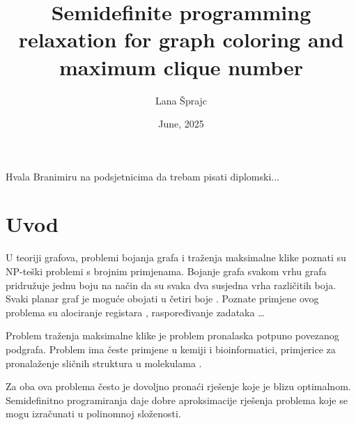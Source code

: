 \documentclass[diplomskirad]{fer}
\title{Semidefinite programming relaxation for graph coloring and maximum clique number}
\author{Lana Šprajc}
\date{June, 2025}
\begin{document}
\maketitle






\begin{zahvale}
  Hvala Branimiru na podsjetnicima da trebam pisati diplomski...
\end{zahvale}


\mainmatter


\tableofcontents


\chapter{Uvod}
\label{pog:uvod}

U teoriji grafova, problemi bojanja grafa i traženja maksimalne klike poznati su NP-teški problemi s brojnim primjenama. Bojanje grafa svakom vrhu 
grafa pridružuje jednu boju na način da su svaka dva susjedna vrha različitih boja. Svaki planar graf je moguće obojati u četiri boje \cite{fritsch1998four}.
Poznate primjene ovog problema su alociranje registara \cite{inproceedings}, raspoređivanje zadataka \cite{10.1093/comjnl/12.4.317}\dots

Problem traženja maksimalne klike je problem pronalaska potpuno povezanog podgrafa. Problem ima česte primjene u kemiji i bioinformatici,
primjerice za pronalaženje sličnih struktura u molekulama \cite{NAP4886}.

Za oba ova problema često je dovoljno pronaći rješenje koje je blizu optimalnom. Semidefinitno programiranja daje dobre aproksimacije rješenja problema
koje se mogu izračunati u polinomnoj složenosti.
\end{document}
